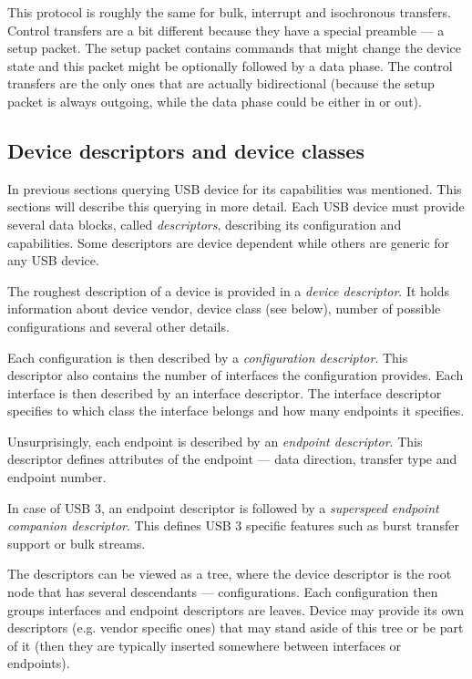 This protocol is roughly the same for bulk, interrupt and isochronous
transfers. Control transfers are a bit different because they have a special
preamble — a setup packet. The setup packet contains commands that might
change the device state and this packet might be optionally followed by a data
phase. The control transfers are the only ones that are actually bidirectional
(because the setup packet is always outgoing, while the data phase could be
either in or out).

\subsection{Device descriptors and device classes}

In previous sections querying USB device for its capabilities was mentioned.
This sections will describe this querying in more detail. Each USB device must
provide several data blocks, called \textit{descriptors}, describing its
configuration and capabilities. Some descriptors are device dependent while
others are generic for any USB device.

The roughest description of a device is provided in a \textit{device
descriptor}. It holds information about device vendor, device class (see
below), number of possible configurations and several other details.

Each configuration is then described by a \textit{configuration descriptor}.
This descriptor also contains the number of interfaces the configuration
provides. Each interface is then described by an interface descriptor. The
interface descriptor specifies to which class the interface belongs and how
many endpoints it specifies.

Unsurprisingly, each endpoint is described by an \textit{endpoint descriptor}.
This descriptor defines attributes of the endpoint — data direction, transfer
type and endpoint number.

In case of USB 3, an endpoint descriptor is followed by a \textit{superspeed
endpoint companion descriptor}. This defines USB 3 specific features such as
burst transfer support or bulk streams.

The descriptors can be viewed as a tree, where the device descriptor is the
root node that has several descendants — configurations. Each configuration
then groups interfaces and endpoint descriptors are leaves. Device may provide
its own descriptors (e.g. vendor specific ones) that may stand aside of this
tree or be part of it (then they are typically inserted somewhere between
interfaces or endpoints).

